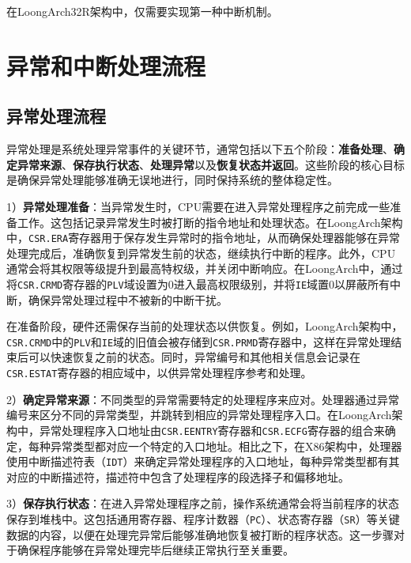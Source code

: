 在LoongArch32R架构中，仅需要实现第一种中断机制。

\section{异常和中断处理流程}\label{sec:07-exceptions-008}

\subsection{异常处理流程}\label{sec:07-exceptions-009}

异常处理是系统处理异常事件的关键环节，通常包括以下五个阶段：\textbf{准备处理}、\textbf{确定异常来源}、\textbf{保存执行状态}、\textbf{处理异常}以及\textbf{恢复状态并返回}。这些阶段的核心目标是确保异常处理能够准确无误地进行，同时保持系统的整体稳定性。

1）\textbf{异常处理准备}：当异常发生时，CPU需要在进入异常处理程序之前完成一些准备工作。这包括记录异常发生时被打断的指令地址和处理状态。在LoongArch架构中，\texttt{CSR.ERA}寄存器用于保存发生异常时的指令地址，从而确保处理器能够在异常处理完成后，准确恢复到异常发生前的状态，继续执行中断的程序。此外，CPU通常会将其权限等级提升到最高特权级，并关闭中断响应。在LoongArch中，通过将\texttt{CSR.CRMD}寄存器的\texttt{PLV}域设置为0进入最高权限级别，并将\texttt{IE}域置0以屏蔽所有中断，确保异常处理过程中不被新的中断干扰。

在准备阶段，硬件还需保存当前的处理状态以供恢复。例如，LoongArch架构中，\texttt{CSR.CRMD}中的\texttt{PLV}和\texttt{IE}域的旧值会被存储到\texttt{CSR.PRMD}寄存器中，这样在异常处理结束后可以快速恢复之前的状态。同时，异常编号和其他相关信息会记录在\texttt{CSR.ESTAT}寄存器的相应域中，以供异常处理程序参考和处理。

2）\textbf{确定异常来源}：不同类型的异常需要特定的处理程序来应对。处理器通过异常编号来区分不同的异常类型，并跳转到相应的异常处理程序入口。在LoongArch架构中，异常处理程序入口地址由\texttt{CSR.EENTRY}寄存器和\texttt{CSR.ECFG}寄存器的组合来确定，每种异常类型都对应一个特定的入口地址。相比之下，在X86架构中，处理器使用中断描述符表（\texttt{IDT}）来确定异常处理程序的入口地址，每种异常类型都有其对应的中断描述符，描述符中包含了处理程序的段选择子和偏移地址。

3）\textbf{保存执行状态}：在进入异常处理程序之前，操作系统通常会将当前程序的状态保存到堆栈中。这包括通用寄存器、程序计数器（\texttt{PC}）、状态寄存器（\texttt{SR}）等关键数据的内容，以便在处理完异常后能够准确地恢复被打断的程序状态。这一步骤对于确保程序能够在异常处理完毕后继续正常执行至关重要。


